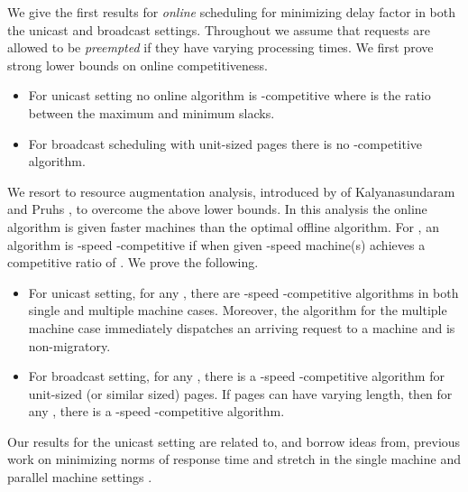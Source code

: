 \documentclass[11pt]{article}
\begin{document}
\medskip
{} We give the first results for {\em online}
scheduling for minimizing delay factor in both the unicast and
broadcast settings. Throughout we assume that requests are allowed to
be {\em preempted} if they have varying processing times. We first
prove strong lower bounds on online competitiveness.
\begin{itemize}
\item For unicast setting no online algorithm is
  -competitive where  is the ratio between
  the maximum and minimum slacks.
\item For broadcast scheduling with  unit-sized pages there is no
-competitive algorithm.
\end{itemize}
We resort to resource augmentation analysis, introduced by of
Kalyanasundaram and Pruhs \cite{KalyanasundaramP95}, to overcome the
above lower bounds. In this analysis the online algorithm is given
faster machines than the optimal offline algorithm. For , an
algorithm  is -speed -competitive if  when given -speed
machine(s) achieves a competitive ratio of . We prove the
following.
\begin{itemize}
\item For unicast setting, for any , there are -speed
  -competitive algorithms in both single and multiple machine
  cases. Moreover, the algorithm for the multiple machine case immediately
  dispatches an arriving request to a machine and is non-migratory.
\item For broadcast setting, for any , there is a
  -speed -competitive algorithm for unit-sized
  (or similar sized) pages.  If pages can have varying length, then
  for any , there is a -speed
  -competitive algorithm.
\end{itemize}

Our results for the unicast setting are related to, and borrow
ideas from, previous work on minimizing  norms of response
time and stretch \cite{BansalP03} in the single machine and
parallel machine settings \cite{AvrahamiA03,ChekuriGKK04}.
\end{document}
